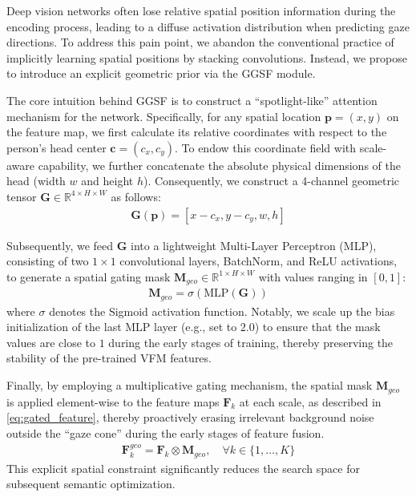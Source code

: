 \documentclass[sigconf,review,anonymous,screen]{acmart}
\begin{document}
Deep vision networks often lose relative spatial position information during the encoding process, leading to a diffuse activation distribution when predicting gaze directions. To address this pain point, we abandon the conventional practice of implicitly learning spatial positions by stacking convolutions. Instead, we propose to introduce an explicit geometric prior via the GGSF module.

The core intuition behind GGSF is to construct a ``spotlight-like'' attention mechanism for the network. Specifically, for any spatial location $\mathbf{p} = (x, y)$ on the feature map, we first calculate its relative coordinates with respect to the person's head center $\mathbf{c} = (c_x, c_y)$. To endow this coordinate field with scale-aware capability, we further concatenate the absolute physical dimensions of the head (width $w$ and height $h$). Consequently, we construct a 4-channel geometric tensor $\mathbf{G} \in \mathbb{R}^{4 \times H \times W}$ as follows:
\begin{equation}
\label{eq:geometric_tensor}
    \begin{aligned}
    \mathbf{G}(\mathbf{p}) = \left[ x - c_x, y - c_y, w, h \right]
    \end{aligned}
\end{equation}

Subsequently, we feed $\mathbf{G}$ into a lightweight Multi-Layer Perceptron (MLP), consisting of two $1 \times 1$ convolutional layers, BatchNorm, and ReLU activations, to generate a spatial gating mask $\mathbf{M}_{geo} \in \mathbb{R}^{1 \times H \times W}$ with values ranging in $[0, 1]$:
\begin{equation}
\label{eq:spatial_mask}
    \begin{aligned}
    \mathbf{M}_{geo} = \sigma\left( \text{MLP}(\mathbf{G}) \right)
    \end{aligned}
\end{equation}
where $\sigma$ denotes the Sigmoid activation function. Notably, we scale up the bias initialization of the last MLP layer (e.g., set to $2.0$) to ensure that the mask values are close to $1$ during the early stages of training, thereby preserving the stability of the pre-trained VFM features.

Finally, by employing a multiplicative gating mechanism, the spatial mask $\mathbf{M}_{geo}$ is applied element-wise to the feature maps $\mathbf{F}_k$ at each scale, as described in \autoref{eq:gated_feature}, thereby proactively erasing irrelevant background noise outside the ``gaze cone'' during the early stages of feature fusion.
\begin{equation}
\label{eq:gated_feature}
    \begin{aligned}
    \mathbf{F}_k^{geo} = \mathbf{F}_k \otimes \mathbf{M}_{geo}, \quad \forall k \in \{1, \dots, K\}
    \end{aligned}
\end{equation}
This explicit spatial constraint significantly reduces the search space for subsequent semantic optimization.
\end{document}
